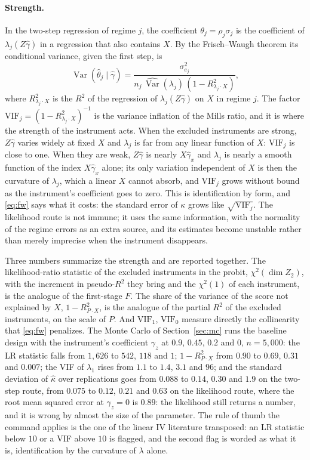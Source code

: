 \documentclass[11pt,a4paper]{article}
\theoremstyle{plain}
\theoremstyle{definition}
\theoremstyle{remark}
\newcommand{\Var}{\operatorname{Var}}
\newcommand{\1}{\mathbf{1}}
\begin{document}
\paragraph{Strength.}
In the two-step regression of regime $j$, the coefficient
$\theta_j=\rho_j\sigma_j$ is the coefficient of $\lambda_j(Z\hat\gamma)$
in a regression that also contains $X$. By the Frisch--Waugh theorem its
conditional variance, given the first step, is
\begin{equation}\label{eq:fw}
\Var(\hat\theta_j\mid\hat\gamma)=\frac{\sigma_{e_j}^2}{n_j\,\widehat{\Var}(\lambda_j)\,(1-R^2_{\lambda_j\cdot X})},
\end{equation}
where $R^2_{\lambda_j\cdot X}$ is the $R^2$ of the regression of
$\lambda_j(Z\hat\gamma)$ on $X$ in regime $j$. The factor
$\mathrm{VIF}_j=(1-R^2_{\lambda_j\cdot X})^{-1}$ is the variance inflation
of the Mills ratio, and it is where the strength of the instrument acts.
When the excluded instruments are strong, $Z\hat\gamma$ varies widely at
fixed $X$ and $\lambda_j$ is far from any linear function of $X$:
$\mathrm{VIF}_j$ is close to one. When they are weak, $Z\hat\gamma$ is
nearly $X\hat\gamma_x$ and $\lambda_j$ is nearly a smooth function of the
index $X\hat\gamma_x$ alone; its only variation independent of $X$ is
then the curvature of $\lambda_j$, which a linear $X$ cannot absorb, and
$\mathrm{VIF}_j$ grows without bound as the instrument's coefficient goes
to zero. This is identification by form, and \eqref{eq:fw} says what it
costs: the standard error of $\kappa$ grows like $\sqrt{\mathrm{VIF}_j}$.
The likelihood route is not immune; it uses the same information, with the
normality of the regime errors as an extra source, and its estimates
become unstable rather than merely imprecise when the instrument
disappears.

Three numbers summarize the strength and are reported together. The
likelihood-ratio statistic of the excluded instruments in the probit,
$\chi^2(\dim Z_2)$, with the increment in pseudo-$R^2$ they bring and the
$\chi^2(1)$ of each instrument, is the analogue of the first-stage $F$.
The share of the variance of the score not explained by $X$,
$1-R^2_{P\cdot X}$, is the analogue of the partial $R^2$ of the excluded
instruments, on the scale of $P$. And $\mathrm{VIF}_1$, $\mathrm{VIF}_0$
measure directly the collinearity that \eqref{eq:fw} penalizes. The
Monte Carlo of Section~\ref{sec:mc} runs the baseline design with the
instrument's coefficient $\gamma_z$ at $0.9$, $0.45$, $0.2$ and $0$,
$n=5{,}000$: the LR statistic falls from $1{,}626$ to $542$, $118$ and
$1$; $1-R^2_{P\cdot X}$ from $0.90$ to $0.69$, $0.31$ and $0.007$; the
VIF of $\lambda_1$ rises from $1.1$ to $1.4$, $3.1$ and $96$; and the
standard deviation of $\hat\kappa$ over replications goes from $0.088$ to
$0.14$, $0.30$ and $1.9$ on the two-step route, from $0.075$ to $0.12$,
$0.21$ and $0.63$ on the likelihood route, where the root mean squared
error at $\gamma_z=0$ is $0.89$: the likelihood still returns a number,
and it is wrong by almost the size of the parameter. The rule of thumb the
command applies is the one of the linear IV literature transposed: an LR
statistic below $10$ or a VIF above $10$ is flagged, and the second flag
is worded as what it is, identification by the curvature of $\lambda$
alone.
\end{document}
